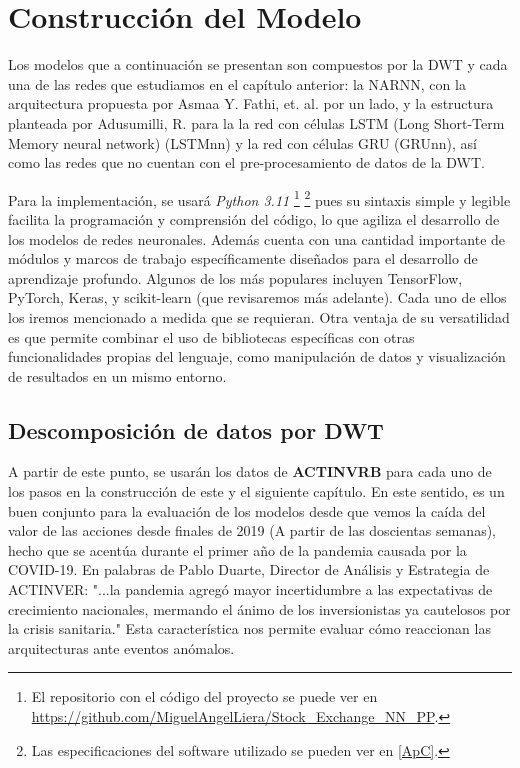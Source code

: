 \chapter{Construcción del Modelo} 
\label{cap:construccion} 

Los modelos que a continuación se presentan son compuestos por la DWT y cada una de las redes que estudiamos en el capítulo anterior: la NARNN, con la arquitectura propuesta por Asmaa Y. Fathi, et. al. \cite{DWT-NARNN} por un lado, y la estructura planteada por Adusumilli, R. \cite{ML_SP} para la la red con células LSTM (Long Short-Term Memory neural network) (LSTMnn) y la red con células GRU (GRUnn), así como las redes que no cuentan con el pre-procesamiento de datos de la DWT. 

Para la implementación, se usará \textit{Python 3.11} \footnote{El repositorio con el código del proyecto se puede ver en \url{https://github.com/MiguelAngelLiera/Stock_Exchange_NN_PP}.} \footnote{Las especificaciones del software utilizado se pueden ver en \ref{ApC}.} pues su sintaxis simple y legible facilita la programación y comprensión del código, lo que agiliza el desarrollo de los modelos de redes neuronales. Además cuenta con una cantidad importante de módulos y marcos de trabajo específicamente diseñados para el desarrollo de aprendizaje profundo. Algunos de los más populares incluyen TensorFlow, PyTorch, Keras, y scikit-learn (que revisaremos más adelante). Cada uno de ellos los iremos mencionado a medida que se requieran. Otra ventaja de su versatilidad es que permite combinar el uso de bibliotecas específicas con otras funcionalidades propias del lenguaje, como manipulación de datos y visualización de resultados en un mismo entorno.

\newpage

\section{Descomposición de datos por DWT}

A partir de este punto, se usarán los datos de \textbf{ACTINVRB} para cada uno de los pasos en la construcción de este y el siguiente capítulo. En este sentido, es un buen conjunto para la evaluación de los modelos desde que vemos la caída del valor de las acciones desde finales de 2019 (A partir de las doscientas semanas), hecho que se acentúa durante el primer año de la pandemia causada por la COVID-19. En palabras de Pablo Duarte, Director de Análisis y Estrategia de ACTINVER: "...la pandemia agregó mayor incertidumbre a las expectativas de crecimiento nacionales, mermando el ánimo de los inversionistas ya cautelosos por la crisis sanitaria." \cite{oportunidades_Actinver} Esta característica nos permite evaluar cómo reaccionan las arquitecturas ante eventos anómalos.

